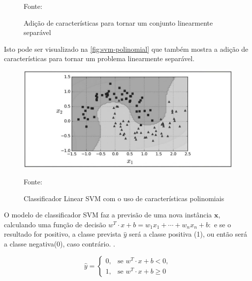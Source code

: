 \begin{figure}[h!]
	\centering
	\caption{Adição de características para tornar um conjunto linearmente separável}
	
	\label{fig:svm-nao-linear}
	{\scriptsize 	Fonte: }
\end{figure}

Isto pode ser visualizado na \autoref{fig:svm-polinomial} que também mostra a adição de características para tornar um problema linearmente separável.
\begin{figure}[h!]
	\centering
	\caption{Classificador Linear SVM com o uso de características polinomiais}
	\includegraphics[width=.8\textwidth]{imagens/svm-polinomial.png}
		
	\label{fig:svm-polinomial}
	{\scriptsize 	Fonte: }
\end{figure}

O modelo de classificador SVM faz a previsão de uma nova instância $\textbf{x}$, calculando uma função de decisão $w^T \cdot x + b = w_1 x_1 + \cdots + w_n x_n + b:$ e se o resultado for positivo, a classe prevista $\hat{y}$ será a classe positiva (1), ou então será a classe negativa(0), caso contrário. \cite{soman_machine_2009}.

\begin{equation}
\hat{y} = \left \{ \begin{matrix} 0, & \mbox{se }w^T \cdot x + b < 0, \\ 
							      1, & \mbox{se }w^T \cdot x + b \ge 0 \end{matrix} \right.
\end{equation}

